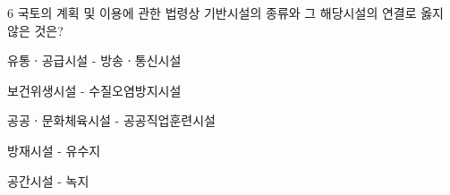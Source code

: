 \begin{question}{6}
국토의 계획 및 이용에 관한 법령상 기반시설의 종류와 그 해당시설의 연결로 옳지 않은 것은?
\begin{choices}
  \item 유통ㆍ공급시설 - 방송ㆍ통신시설
  \item 보건위생시설 - 수질오염방지시설
  \item 공공ㆍ문화체육시설 - 공공직업훈련시설
  \item 방재시설 - 유수지
  \item 공간시설 - 녹지
\end{choices}
\end{question}
